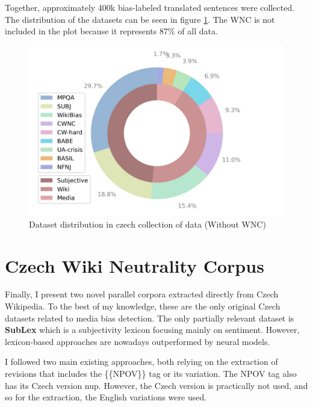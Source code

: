 Together, approximately 400k bias-labeled translated sentences were collected. The distribution of the datasets can be seen in figure \ref{fig:cz_data}. The WNC is not included in the plot because it represents 87\% of all data. 


\begin{figure}[h]
  \includegraphics[scale=0.5]{my_modules/multimedia/pies.png}
  \caption{Dataset distribution in czech collection of data (Without WNC)}
  \label{fig:cz_data}
\end{figure}




\section{Czech Wiki Neutrality Corpus}
Finally, I present two novel parallel corpora extracted directly from Czech Wikipedia. To the best of my knowledge, these are the only original Czech datasets related to media bias detection. The only partially relevant dataset is \textbf{SubLex}\cite{11858/00-097C-0000-0022-FF60-B} which is a subjectivity lexicon focusing mainly on sentiment. However, lexicon-based approaches are nowadays outperformed by neural models.

I followed two main existing approaches, both relying on the extraction of revisions that includes the \{\{NPOV\}\} tag or its variation. The NPOV tag also has its Czech version \Gls{nup}. However, the Czech version is practically not used, and so for the extraction, the English variations were used.





